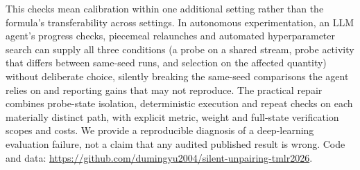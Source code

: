 This checks mean calibration within one additional setting rather than
the formula's transferability across settings.
In autonomous experimentation, an LLM agent's progress checks, piecemeal
relaunches and automated hyperparameter search can supply all three
conditions (a probe on a shared stream, probe activity that differs between
same-seed runs, and selection on the affected quantity) without deliberate
choice, silently breaking the same-seed comparisons the agent relies on and
reporting gains that may not reproduce.
The practical repair combines probe-state isolation,
deterministic execution and repeat checks on each materially distinct path,
with explicit metric, weight and full-state verification scopes and costs.
We provide a reproducible diagnosis of a deep-learning evaluation failure,
not a claim that any audited published result is wrong.
Code and data: \url{https://github.com/dumingyu2004/silent-unpairing-tmlr2026}.
